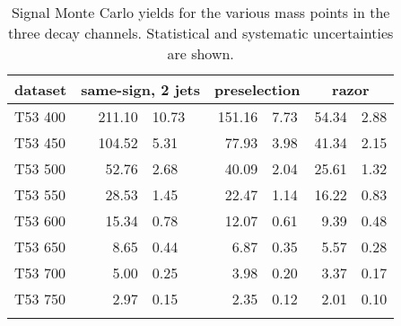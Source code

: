         \begin{table}[pbt]
            \centering
            \begin{tabular}{l *3{r@{$\pm$}l}}
                
\toprule
dataset & \multicolumn{2}{c}{same-sign, 2 jets}& \multicolumn{2}{c}{preselection}& \multicolumn{2}{c}{razor} \\
\midrule
T53 400& 211.10 & 10.73& 151.16 & 7.73& 54.34 & 2.88\\
T53 450& 104.52 & 5.31& 77.93 & 3.98& 41.34 & 2.15\\
T53 500& 52.76 & 2.68& 40.09 & 2.04& 25.61 & 1.32\\
T53 550& 28.53 & 1.45& 22.47 & 1.14& 16.22 & 0.83\\
T53 600& 15.34 & 0.78& 12.07 & 0.61& 9.39 & 0.48\\
T53 650& 8.65 & 0.44& 6.87 & 0.35& 5.57 & 0.28\\
T53 700& 5.00 & 0.25& 3.98 & 0.20& 3.37 & 0.17\\
T53 750& 2.97 & 0.15& 2.35 & 0.12& 2.01 & 0.10\\
 \\
\bottomrule

            \end{tabular}
            \caption{Signal Monte Carlo yields for the various mass points
            in the three decay channels. Statistical and systematic uncertainties are shown.}
            \label{tab:signal_yields_sum}
        \end{table}

